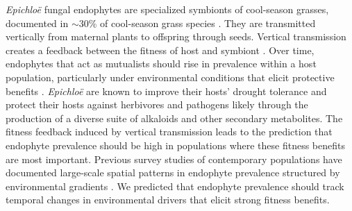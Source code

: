 \documentclass[11pt]{article}
\let\cite\citep
\newcommand{\firstrevise}[1]{{\color{black}{#1}}}
\begin{document}
\emph{Epichloë} fungal endophytes are specialized symbionts of cool-season grasses, documented in $\sim 30$\% of cool-season grass species \citep{leuchtmann1992systematics}.
They are \firstrevise{predominantly} transmitted vertically from maternal plants to offspring through seeds.
Vertical transmission creates a feedback between the fitness of host and symbiont \citep{fine1975vectors, douglas1998host, rudgers2009fungus}. 
Over time, endophytes that act as mutualists should rise in prevalence within a host population, particularly under environmental conditions that elicit protective benefits \citep{donald2021context}. 
\emph{Epichloë} are known to improve their hosts' drought tolerance \cite{decunta2021systematic} and protect their hosts against herbivores \cite{crawford2010fungal} and pathogens \cite{xia2018role} likely through the production of a diverse suite of alkaloids and other secondary metabolites.
The fitness feedback induced by vertical transmission leads to the prediction that endophyte prevalence should be high in populations where these fitness benefits are most important. 
Previous survey studies of contemporary populations have documented large-scale spatial patterns in endophyte prevalence structured by environmental gradients \citep{granath2007variation,bazely2007broad, afkhami2012fungal,sneck2017variation}.
We predicted that endophyte prevalence should track temporal changes in environmental drivers \linelabel{R2C21-begin}\firstrevise{(i.e. drought)}  that elicit strong fitness benefits.
\end{document}
